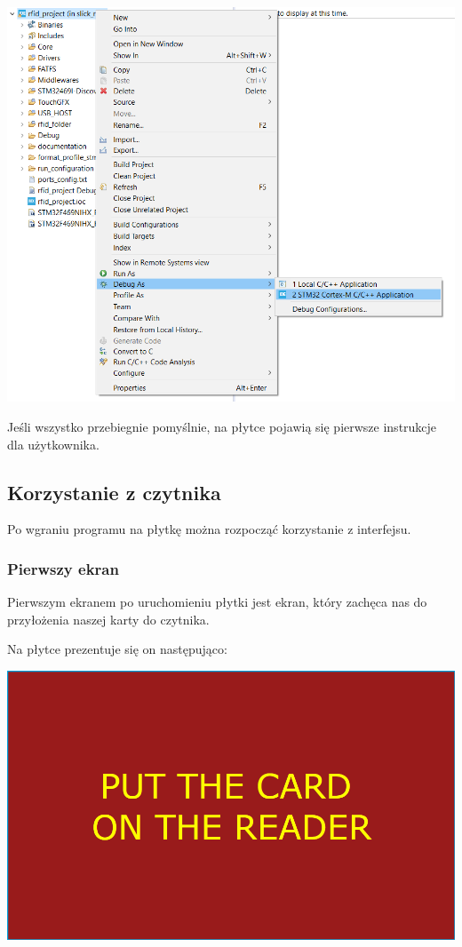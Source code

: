 \documentclass[12pt,hidelinks]{article}
\begin{document}
    \begin{center}
        \includegraphics[scale=0.5]{img/run_project.png}
    \end{center}

    Jeśli wszystko przebiegnie pomyślnie, na płytce pojawią się pierwsze instrukcje dla użytkownika.

    \newpage

    \subsection{Korzystanie z czytnika}
    Po wgraniu programu na płytkę można rozpocząć korzystanie z interfejsu.

    \subsubsection{Pierwszy ekran}
    Pierwszym ekranem po uruchomieniu płytki jest ekran, który zachęca nas do przyłożenia naszej karty do czytnika.

    Na płytce prezentuje się on następująco:
    \begin{center}
        \includegraphics[scale=0.75]{img/screen1.png}
    \end{center}
\end{document}

